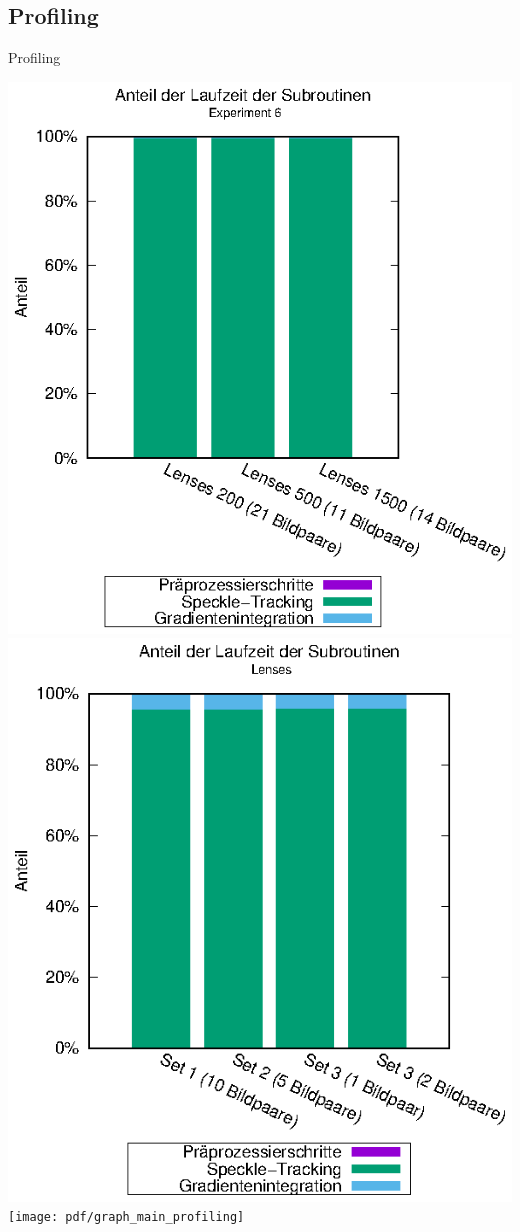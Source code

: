 \subsection{Profiling}
\begin{frame}[allowframebreaks]{Profiling}
	\begin{center}
		\hspace{-0.7cm}
		\includegraphics[width=0.4\linewidth]{pdf/main_exp6.eps}
		\hspace{-1.0cm}
		\includegraphics[width=0.4\linewidth]{pdf/main_lenses.eps}
		\hspace{-0.3cm}
		\texttt{[image: pdf/graph\_main\_profiling]}
		
		\framebreak
		

\end{center}
\end{frame}
